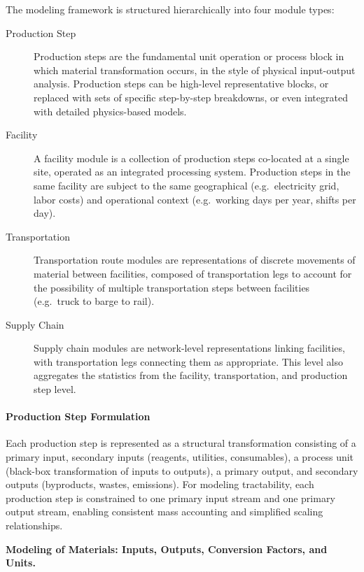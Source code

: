 The modeling framework is structured hierarchically into four module types:

\begin{description}
    \item[Production Step] Production steps are the fundamental unit operation or process block in which material transformation occurs, in the style of physical input-output analysis. Production steps can be high-level representative blocks, or replaced with sets of specific step-by-step breakdowns, or even integrated with detailed physics-based models.

    \item[Facility] A facility module is a collection of production steps co-located at a single site, operated as an integrated processing system. Production steps in the same facility are subject to the same geographical (e.g.\ electricity grid, labor costs) and operational context (e.g.\ working days per year, shifts per day).

    \item[Transportation] Transportation route modules are representations of discrete movements of material between facilities, composed of transportation legs to account for the possibility of multiple transportation steps between facilities (e.g.\ truck to barge to rail).

    \item[Supply Chain] Supply chain modules are network-level representations linking facilities, with transportation legs connecting them as appropriate. This level also aggregates the statistics from the facility, transportation, and production step level.
\end{description}

\paragraph{Production Step Formulation}\label{app:04-methods-system-prodstep}

Each production step is represented as a structural transformation consisting of a primary input, secondary inputs (reagents, utilities, consumables), a process unit (black-box transformation of inputs to outputs), a primary output, and secondary outputs (byproducts, wastes, emissions). For modeling tractability, each production step is constrained to one primary input stream and one primary output stream, enabling consistent mass accounting and simplified scaling relationships.

\medskip
\noindent\textbf{Modeling of Materials: Inputs, Outputs, Conversion Factors, and Units.}\quad


